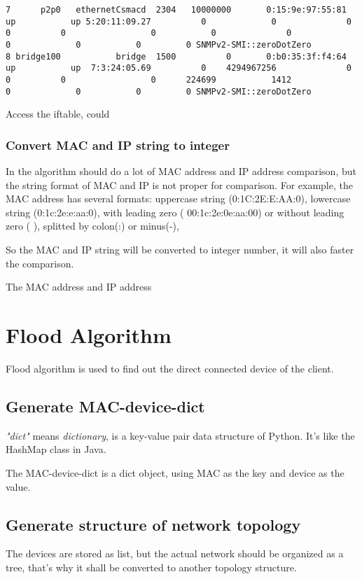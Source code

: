 \begin{lstlisting}
7      p2p0   ethernetCsmacd  2304   10000000       0:15:9e:97:55:81            up           up 5:20:11:09.27          0             0              0            0          0                 0           0              0               0             0           0         0 SNMPv2-SMI::zeroDotZero
8 bridge100           bridge  1500          0       0:b0:35:3f:f4:64            up           up  7:3:24:05.69          0    4294967256              0            0          0                 0      224699           1412               0             0           0         0 SNMPv2-SMI::zeroDotZero
\end{lstlisting}

Access the iftable, could 


\subsubsection{Convert MAC and IP string to integer}

In the algorithm should do a lot of MAC address and IP address comparison, but the string format of MAC and IP is not proper for comparison. For example, the MAC address has several formats: uppercase string (0:1C:2E:E:AA:0), lowercase string (0:1c:2e:e:aa:0), with leading zero ( 00:1c:2e:0e:aa:00) or without leading zero ( ), splitted by colon(:) or minus(-), 

So the MAC and IP string will be converted to integer number, it will also faster the comparison.

The MAC address and IP address 

\subsubsection{}

\section{Flood Algorithm}

Flood algorithm is used to find out the direct connected device of the client.

\subsection{Generate MAC-device-dict}

\textit{"dict"} means \textit{dictionary}, is a key-value pair data structure of Python. It's like the HashMap class in Java.

The MAC-device-dict is a dict object, using MAC as the key and device as the value.

\subsection{Generate structure of network topology}

The devices are stored as list, but the actual network should be organized as a tree, that's why it shall be converted to another topology structure.

\subsection{}